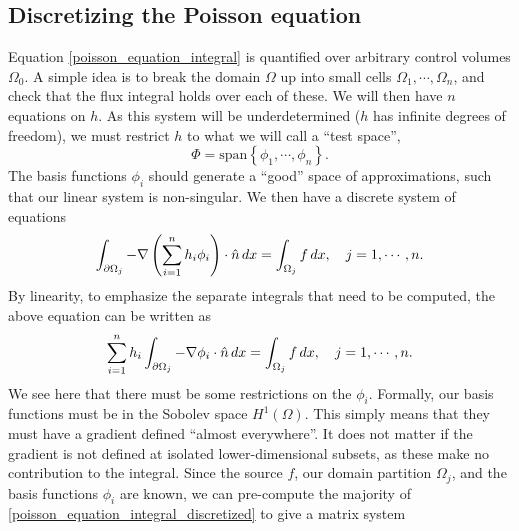\subsection{Discretizing the Poisson equation}\label{discretizing_poisson}
Equation \eqref{poisson_equation_integral} is quantified over arbitrary control volumes $\Omega_0$.
A simple idea is to break the domain $\Omega$ up into small cells $\Omega_1,\cdots,\Omega_n$, and check that the flux integral holds over each of these.
We will then have $n$ equations on $h$. As this system will be underdetermined ($h$ has infinite degrees of freedom), we must
restrict $h$ to what we will call a ``test space'',
    $$\Phi = \text{span}\left\{\phi_1,\cdots,\phi_n\right\}.$$
The basis functions $\phi_i$ should generate a ``good'' space of approximations,
such that our linear system is non-singular.
We then have a discrete system of equations
\begin{align*}
    \int_{{\partial\Omega}_j} -\nabla \left(\sum_{i=1}^n h_i\phi_i\right)\cdot \hat{n}\,dx = \int_{{\Omega}_j} f\,dx,\quad j=1,\cdots,n.
\end{align*}
By linearity, to emphasize the separate integrals that need to be computed, the above equation can be written as
\begin{equation}\label{poisson_equation_integral_discretized}
    \sum_{i=1}^n h_i\int_{{\partial\Omega}_j} -\nabla \phi_i \cdot \hat{n}\,dx = \int_{{\Omega}_j} f\,dx,\quad j=1,\cdots,n.
\end{equation}
We see here that there must be some restrictions on the $\phi_i$.
Formally, our basis functions must be in the Sobolev space $H^1(\Omega)$. This simply means that they must have a gradient defined ``almost everywhere''.
It does not matter if the gradient is not defined at isolated lower-dimensional subsets, as these make no contribution to
the integral. Since the source $f$, our domain partition $\Omega_j$, and the basis functions $\phi_i$ are known, we can pre-compute
the majority of \eqref{poisson_equation_integral_discretized} to give a matrix system

